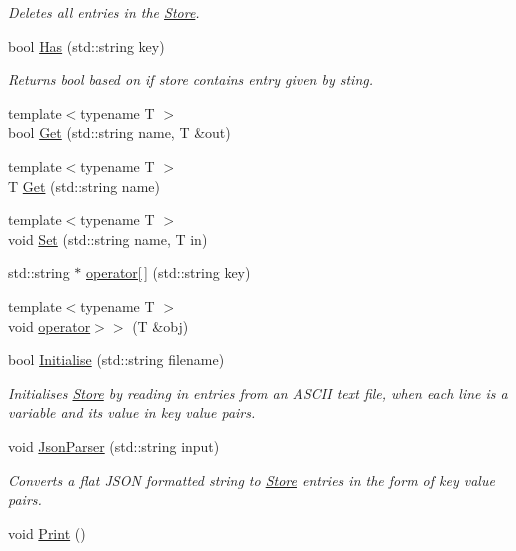 \begin{DoxyCompactItemize}
\begin{DoxyCompactList}\small\item\em Deletes all entries in the \hyperlink{classStore}{Store}. \end{DoxyCompactList}\item 
bool \hyperlink{classStore_a41eaa81c4612fb5bdbf850afb6428977}{Has} (std\-::string key)
\begin{DoxyCompactList}\small\item\em Returns bool based on if store contains entry given by sting. \end{DoxyCompactList}\item 
{\footnotesize template$<$typename T $>$ }\\bool \hyperlink{classStore_abdc0134daa34b808328070f5d6b295f3}{Get} (std\-::string name, T \&out)
\item 
{\footnotesize template$<$typename T $>$ }\\T \hyperlink{classStore_a26d26db839f734e0af5404b7dac40dae}{Get} (std\-::string name)
\item 
{\footnotesize template$<$typename T $>$ }\\void \hyperlink{classStore_af586739813ce18da6f5e3561d134a814}{Set} (std\-::string name, T in)
\item 
std\-::string $\ast$ \hyperlink{classStore_a790ca02bc7d11648edf0c8d5df3751fe}{operator\mbox{[}$\,$\mbox{]}} (std\-::string key)
\item 
{\footnotesize template$<$typename T $>$ }\\void \hyperlink{classStore_abe9b65d1308c43dc4158b00d6aed7385}{operator$>$$>$} (T \&obj)
\item 
bool \hyperlink{classStore_a5247080901fb214804d0191681a30a83}{Initialise} (std\-::string filename)
\begin{DoxyCompactList}\small\item\em Initialises \hyperlink{classStore}{Store} by reading in entries from an A\-S\-C\-I\-I text file, when each line is a variable and its value in key value pairs. \end{DoxyCompactList}\item 
void \hyperlink{classStore_adb84e3fb286cae07f64e8186b7ab04e1}{Json\-Parser} (std\-::string input)
\begin{DoxyCompactList}\small\item\em Converts a flat J\-S\-O\-N formatted string to \hyperlink{classStore}{Store} entries in the form of key value pairs. \end{DoxyCompactList}\item 
\hypertarget{classStore_a9d2f000bd849a9f5de71c3ba62dca340}{void \hyperlink{classStore_a9d2f000bd849a9f5de71c3ba62dca340}{Print} ()}\label{classStore_a9d2f000bd849a9f5de71c3ba62dca340}


\end{DoxyCompactItemize}
